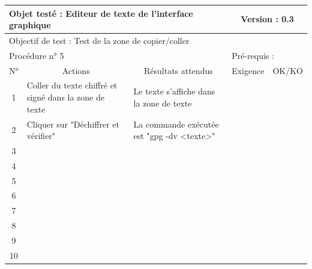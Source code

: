 \documentclass{../res/univ-projet}
\begin{document}
\begin{center}
    \begin{tabular}{|c|p{5cm}|p{5cm}|p{1.5cm}|p{1.5cm}|}
      \hline
      \multicolumn{3}{|l|}{Objet testé : Editeur de texte de l'interface graphique} & \multicolumn{2}{c|}{Version : 0.3}\\ \hline
      \multicolumn{5}{|l|}{Objectif de test : Test de la zone de copier/coller}\\ \hline
      \multicolumn{3}{|l|}{Procédure n° 5} & \multicolumn{2}{p{3cm}|}{Pré-requis : }\\ \hline
      \multicolumn{1}{|c|}{N°} & \multicolumn{1}{c|}{Actions} & \multicolumn{1}{c|}{Résultats attendus} & 
      \multicolumn{1}{c|}{Exigence} & \multicolumn{1}{c|}{OK/KO}\\ \hline
      1 & Coller du texte chiffré et signé dans la zone de texte & Le texte s'affiche dans la zone de texte &  & \\
      2 & Cliquer sur "Déchiffrer et vérifier" & La commande exécutée est "gpg -dv <texte>" &  & \\
      3 &  &  &  & \\ 
	  4 &  &  &  & \\
      5 &  &  &  & \\
	  6 &  &  &  & \\
      7 &  &  &  & \\
      8 &  &  &  & \\
      9 &  &  &  & \\
      10 &  &  &  &\\ 
	\hline
    \end{tabular}
    \vskip 2.2cm




\end{center}
\end{document}
